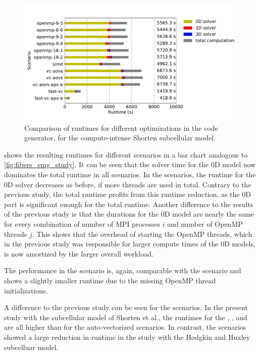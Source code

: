 \begin{figure}
  \centering%
  \includegraphics[width=\textwidth]{images/results/studies/fibers_emg_study_shorten.pdf}%
  \caption{Comparison of runtimes for different optimizations in the code generator, for the compute-intense Shorten subcellular model.}%
  \label{fig:fibers_emg_study_shorten}%
\end{figure}%

 shows the resulting runtimes for different scenarios in a bar chart analogous to \cref{fig:fibers_emg_study}. It can be seen that the solver time for the 0D model now dominates the total runtime in all scenarios. In the  scenarios, the runtime for the 0D solver decreases as before, if more threads are used in total. Contrary to the previous study, the total runtime profits from this runtime reduction, as the 0D part is significant enough for the total runtime. Another difference to the results of the previous study is that the durations for the 0D model are nearly the same for every combination of number of MPI processes $i$ and number of OpenMP threads $j$. This shows that the overhead of starting the OpenMP threads, which in the previous study was responsible for larger compute times of the 0D models, is now amortized by the larger overall workload.

The performance in the  scenario is, again, comparable with the  scenario and shows a slightly smaller runtime due to the missing OpenMP thread initializations.

A difference to the previous study can be seen for the  scenarios. In the present study with the subcellular model of Shorten et al., the runtimes for the , , and  are all higher than for the auto-vectorized scenarios. In contrast, the  scenarios showed a large reduction in runtime in the study with the Hodgkin and Huxley subcelluar model. 

